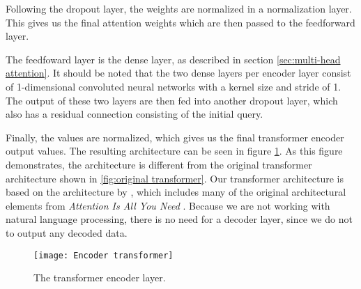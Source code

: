 Following the dropout layer, the weights are normalized in a normalization layer. 
This gives us the final attention weights which are then passed to the feedforward layer.

The feedfoward layer is the dense layer, as described in section \ref{sec:multi-head attention}.
It should be noted that the two dense layers per encoder layer consist of 1-dimensional convoluted neural networks with a kernel size and stride of 1.
The output of these two layers are then fed into another dropout layer, which also has a residual connection consisting of the initial query. 

Finally, the values are normalized, which gives us the final transformer encoder output values.
The resulting architecture can be seen in figure \ref{fig:encoder transformer}.
As this figure demonstrates, the architecture is different from the original transformer architecture shown in \ref{fig:original transformer}.
Our transformer architecture is based on the architecture by \citet{schmitz_stock_2020}, which includes many of the original architectural elements from \textit{Attention Is All You Need} \cite{AttentionIsAllYouNeed}.
Because we are not working with natural language processing, there is no need for a decoder layer, since we do not to output any decoded data. 

\begin{figure}[h]
\centering
\texttt{[image: Encoder transformer]}
\caption{The transformer encoder layer.}
\label{fig:encoder transformer}
\end{figure}